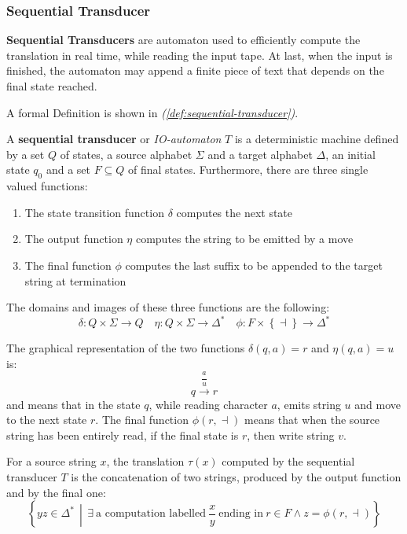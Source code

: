 \documentclass[english]{article}
\begin{document}
\subsubsection{Sequential Transducer}

\textbf{Sequential Transducers} are automaton used to efficiently compute the translation in real time, while reading the input tape.
At last, when the input is finished, the automaton may append a finite piece of text that depends on the final state reached.

A formal Definition is shown in \textit{(\ref{def:sequential-transducer})}.

\begin{definition}
  \label{def:sequential-transducer}
  A \textbf{sequential transducer} or \textit{IO-automaton} \(T\) is a deterministic machine defined by a set \(Q\) of states, a source alphabet \(\Sigma\) and a target alphabet \(\Delta\), an initial state \(q_0\) and a set \(F \subseteq Q\) of final states.
  Furthermore, there are three single valued functions:

  \begin{enumerate}
    \item The state transition function \(\delta\) computes the next state
    \item The output function \(\eta\) computes the string to be emitted by a move
    \item The final function \(\phi\) computes the last suffix to be appended to the target string at termination
  \end{enumerate}

  The domains and images of these three functions are the following:
  \[ \delta: Q \times \Sigma \rightarrow Q \quad \eta: Q \times \Sigma \rightarrow \Delta^\ast \quad \phi : F \times \left\{ \dashv \right\} \rightarrow \Delta^\ast \]
\end{definition}

The graphical representation of the two functions \(\delta(q, a) = r\) and \(\eta(q, a) = u\) is:
\[ q \xrightarrow{\dfrac{a}{u}} r \]
and means that in the state \(q\), while reading character \(a\), emits string \(u\) and move to the next state \(r\).
The final function \(\phi(r, \dashv)\) means that when the source string has been entirely read, if the final state is \(r\), then write string \(v\).

For a source string \(x\), the translation \(\tau(x)\) computed by the sequential transducer \(T\) is the concatenation of two strings, produced by the output function and by the final one:
\[ \left\{ yz \in \Delta^\ast \, \middle\vert \, \exists \ \text{a computation labelled} \ \dfrac{x}{y} \ \text{ending in} \ r \in F \land z = \phi\left( r, \dashv \right) \right\} \]
\end{document}

